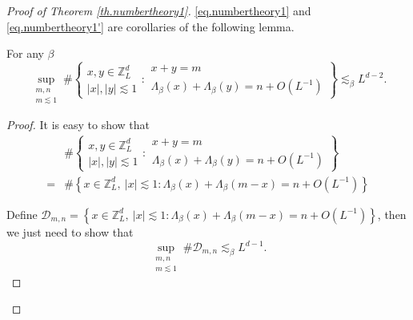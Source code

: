 
\begin{proof}[Proof of Theorem \ref{th.numbertheory1}]\eqref{eq.numbertheory1} and \eqref{eq.numbertheory1'} are corollaries of the following lemma. 

\begin{lem}\label{lem.rationallemma} For any $\beta$
\begin{equation}
    \sup_{\substack{m,n\\m\lesssim 1}} \#\left\{\begin{array}{cc}
         x,y\in\mathbb{Z}^d_L  \\
         |x|,|y|\lesssim 1
    \end{array}:\begin{array}{cc}
         x+y=m  \\
         \Lambda_{\beta}(x)+\Lambda_{\beta}(y)=n+O(L^{-1})
    \end{array}\right\}\lesssim_{\beta} L^{d-2} .
\end{equation}
\end{lem}
\begin{proof}
It is easy to show that
\begin{equation}
\begin{split}
    &\#\left\{\begin{array}{cc}
         x,y\in\mathbb{Z}^d_L  \\
         |x|,|y|\lesssim 1
    \end{array}:\begin{array}{cc}
         x+y=m  \\
         \Lambda_{\beta}(x)+\Lambda_{\beta}(y)=n+O(L^{-1})
    \end{array}\right\}
    \\
    =&\#\left\{
         x\in \mathbb{Z}^d_L,\ |x|\lesssim 1:\Lambda_{\beta}(x)+\Lambda_{\beta}(m-x)=n+O(L^{-1})\right\}
\end{split}
\end{equation}

Define $\mathcal{D}_{m,n}=\left\{x\in \mathbb{Z}^d_L,\ |x|\lesssim 1: \Lambda_{\beta}(x)+\Lambda_{\beta}(m-x)=n+O(L^{-1})\right\}$, then we just need to show that 
\begin{equation}\label{eq.goalofrationallemma}
    \sup_{\substack{m,n\\m\lesssim 1}} \#\mathcal{D}_{m,n}\lesssim_{\beta} L^{d-1} .
\end{equation}


\end{proof}
\end{proof}
